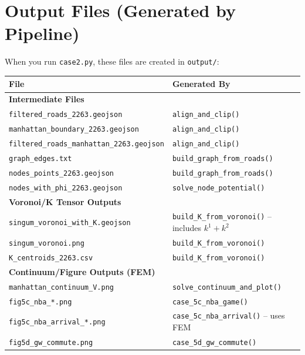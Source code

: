 \documentclass[11pt]{article}
\begin{document}
\section{Output Files (Generated by Pipeline)}

When you run \texttt{case2.py}, these files are created in \texttt{output/}:

\begin{longtable}{p{5.5cm}p{8cm}}
\toprule
\textbf{File} & \textbf{Generated By} \\
\midrule
\endfirsthead

\multicolumn{2}{l}{\textbf{Intermediate Files}} \\
\midrule
\texttt{filtered\_roads\_2263.geojson} & \texttt{align\_and\_clip()} \\
\texttt{manhattan\_boundary\_2263.geojson} & \texttt{align\_and\_clip()} \\
\texttt{filtered\_roads\_manhattan\_2263.geojson} & \texttt{align\_and\_clip()} \\
\texttt{graph\_edges.txt} & \texttt{build\_graph\_from\_roads()} \\
\texttt{nodes\_points\_2263.geojson} & \texttt{build\_graph\_from\_roads()} \\
\texttt{nodes\_with\_phi\_2263.geojson} & \texttt{solve\_node\_potential()} \\
\midrule

\multicolumn{2}{l}{\textbf{Voronoi/K Tensor Outputs}} \\
\midrule
\texttt{singum\_voronoi\_with\_K.geojson} & \texttt{build\_K\_from\_voronoi()} -- includes $k^1 + k^2$ \\
\texttt{singum\_voronoi.png} & \texttt{build\_K\_from\_voronoi()} \\
\texttt{K\_centroids\_2263.csv} & \texttt{build\_K\_from\_voronoi()} \\
\midrule

\multicolumn{2}{l}{\textbf{Continuum/Figure Outputs (FEM)}} \\
\midrule
\texttt{manhattan\_continuum\_V.png} & \texttt{solve\_continuum\_and\_plot()} \\
\texttt{fig5c\_nba\_*.png} & \texttt{case\_5c\_nba\_game()} \\
\texttt{fig5c\_nba\_arrival\_*.png} & \texttt{case\_5c\_nba\_arrival()} -- uses FEM \\
\texttt{fig5d\_gw\_commute.png} & \texttt{case\_5d\_gw\_commute()} \\
\bottomrule
\end{longtable}
\end{document}
